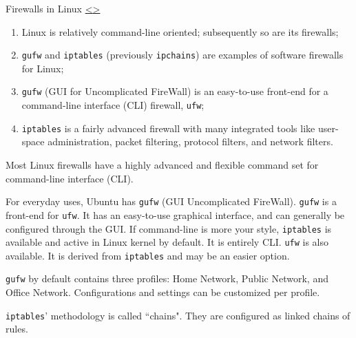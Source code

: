 \documentclass[12pt]{extarticle}
\newenvironment{instructionblock}{\Large\bgroup}{\egroup}
\newcommand{\ben}{\begin{enumerate}}
\newcommand{\een}{\end{enumerate}}
\begin{document}
\pagebreak
\begin{slide}{ Firewalls in Linux }{ \hyperref[slide 17]{\textless}\hyperref[slide 19]{\textgreater} }
\vskip 5pt
\begin{instructionblock}
\begin{enumerate}
\item Linux is relatively command-line oriented; subsequently so are its firewalls;
\item \texttt{gufw} and \texttt{iptables} (previously \texttt{ipchains}) are examples of software firewalls for Linux;
\item \texttt{gufw} (GUI for Uncomplicated FireWall) is an easy-to-use front-end for a command-line interface (CLI) firewall, \texttt{ufw};
\item \texttt{iptables} is a fairly advanced firewall with many integrated tools like user-space administration, packet filtering, protocol filters, and network filters.
\end{enumerate}
\end{instructionblock}
\end{slide}


\vspace{8mm}
\ben

\item { Most Linux firewalls have a highly advanced and flexible command set for command-line interface (CLI). }

\item { For everyday uses, Ubuntu has \texttt{gufw} (GUI Uncomplicated FireWall). \texttt{gufw} is a front-end for \texttt{ufw}. It has an easy-to-use graphical interface, and can generally be configured through the GUI. If command-line is more your style, \texttt{iptables} is available and active in Linux kernel by default. It is entirely CLI. \texttt{ufw} is also available. It is derived from \texttt{iptables} and may be an easier option. }

\item { \texttt{gufw} by default contains three profiles: Home Network, Public Network, and Office Network. Configurations and settings can be customized per profile. 

\item \texttt{iptables}' methodology is called ``chains". They are configured as linked chains of rules. }

\een


\end{document}
